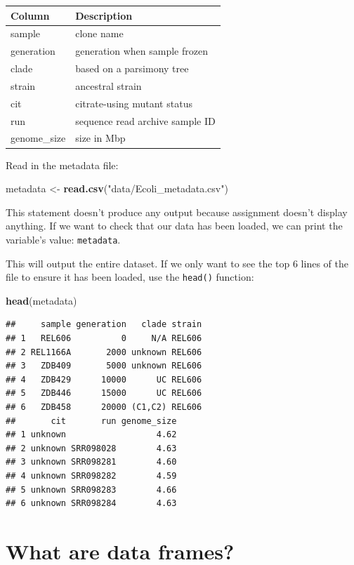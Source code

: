 \documentclass[]{book}
\newenvironment{Shaded}{\begin{snugshade}}{\end{snugshade}}
\newcommand{\KeywordTok}[1]{\textcolor[rgb]{0.13,0.29,0.53}{\textbf{#1}}}
\newcommand{\NormalTok}[1]{#1}
\newcommand{\StringTok}[1]{\textcolor[rgb]{0.31,0.60,0.02}{#1}}
\begin{document}
\begin{longtable}[]{@{}ll@{}}
\toprule
Column & Description\tabularnewline
\midrule
\endhead
sample & clone name\tabularnewline
generation & generation when sample frozen\tabularnewline
clade & based on a parsimony tree\tabularnewline
strain & ancestral strain\tabularnewline
cit & citrate-using mutant status\tabularnewline
run & sequence read archive sample ID\tabularnewline
genome\_size & size in Mbp\tabularnewline
\bottomrule
\end{longtable}

Read in the metadata file:

\begin{Shaded}
\begin{Highlighting}[]
\NormalTok{metadata <-}\StringTok{ }\KeywordTok{read.csv}\NormalTok{(}\StringTok{"data/Ecoli_metadata.csv"}\NormalTok{)}
\end{Highlighting}
\end{Shaded}

This statement doesn't produce any output because assignment doesn't display anything. If we want to check that our data has been loaded, we can print the variable's value: \texttt{metadata}.

This will output the entire dataset. If we only want to see the top 6 lines of the file to ensure it has been loaded, use the \texttt{head()} function:

\begin{Shaded}
\begin{Highlighting}[]
\KeywordTok{head}\NormalTok{(metadata)}
\end{Highlighting}
\end{Shaded}

\begin{verbatim}
##     sample generation   clade strain
## 1   REL606          0     N/A REL606
## 2 REL1166A       2000 unknown REL606
## 3   ZDB409       5000 unknown REL606
## 4   ZDB429      10000      UC REL606
## 5   ZDB446      15000      UC REL606
## 6   ZDB458      20000 (C1,C2) REL606
##       cit       run genome_size
## 1 unknown                  4.62
## 2 unknown SRR098028        4.63
## 3 unknown SRR098281        4.60
## 4 unknown SRR098282        4.59
## 5 unknown SRR098283        4.66
## 6 unknown SRR098284        4.63
\end{verbatim}

\hypertarget{what-are-data-frames}{%
\section{What are data frames?}\label{what-are-data-frames}}
\end{document}
